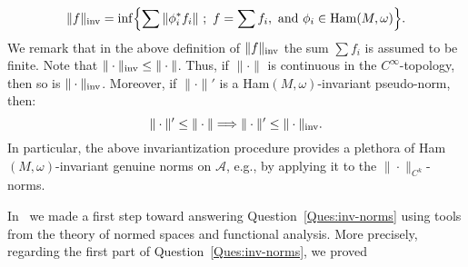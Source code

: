 \documentclass{icmart}
\theoremstyle{definition}
\begin{document}
$$ \| f \|_{\rm inv} =  \inf \Bigl \{  \sum \|\phi_i^*  f_i \|  \ ; \ f = \sum f_i, \ {\rm and \ } \phi_i \in {\rm Ham}(M,\omega)  \Bigr \}. $$
We remark that in the above definition of $\| f \|_{\rm inv}$ the sum
$\sum f_i$ is assumed to be finite. Note that $\| \cdot \|_{\rm inv}
\leq \| \cdot \|$.  Thus, if $\| \cdot \|$ is continuous in the
$C^{\infty}$-topology, then so is $\| \cdot \|_{\rm inv}$. Moreover, if
$\| \cdot \|'$ is a Ham$(M,\omega)$-invariant pseudo-norm, then:
$$ \| \cdot \|' \leq \| \cdot \| \Longrightarrow \| \cdot \|' \leq \| \cdot \|_{\rm inv}.$$
In particular, the above invariantization procedure provides a
plethora of Ham$(M,\omega)$-invariant genuine norms on ${\mathcal
A}$, e.g., by applying it to the $\| \cdot \|_{C^k}$-norms.


\smallskip

In~\cite{OW} we made a first step toward answering Question~\ref{Ques:inv-norms} using tools from the theory of normed spaces and functional analysis. More precisely, regarding the first part of Question~\ref{Ques:inv-norms}, we proved
\end{document}

